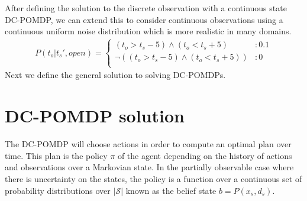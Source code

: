 \documentclass{article} %
\newcommand{\open}{\mathit{open}}
\newcommand{\close}{\mathit{close}}
\begin{document}
After defining the solution to the discrete observation with a continuous state DC-POMDP, we can extend this to consider continuous observations using a continuous uniform noise distribution which is more realistic in many domains. %
{\footnotesize
\begin{align}
P(t_o|t_s',\open) = 
\begin{cases}
 (t_o>t_s-5) \wedge (t_o<t_s+5) &: 0.1 \\
 \neg((t_o>t_s-5) \wedge (t_o<t_s+5)) &: 0 \\
\end{cases}\nonumber
\end{align}
}
Next we define the general solution to solving DC-POMDPs. 


\section{DC-POMDP solution}
The DC-POMDP will choose actions in order to compute an optimal plan over time. This plan is the policy $\pi$ of the agent  depending on the history of actions and observations over a Markovian state. In the partially observable case where there is uncertainty on the states, the policy is a function over a continuous set of probability distributions over $|\mathcal{S}|$ known as the belief state $b = P(x_s,d_s)$.
\end{document}
